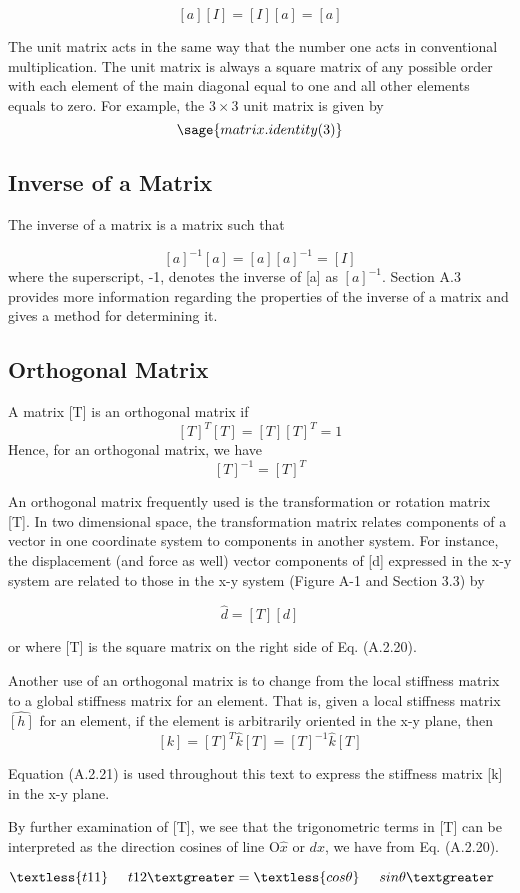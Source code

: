 \documentclass[12pt]{report}
\begin{document}
$$[a][I]=[I][a]=[a]$$

The unit matrix acts in the same way that the number one acts in
conventional multiplication. The unit matrix is always a square matrix
of any possible order with each element of the main diagonal equal to
one and all other elements equals to zero. For example, the $3 \times 3$
unit matrix is given by
$$\sage{matrix.identity(3)}$$

\subsection{Inverse of a Matrix}

The inverse of a matrix is a matrix such that

$$[a]^{-1}[a]=[a][a]^{-1}=[I]$$
where the superscript, -1, denotes the inverse of [a] as $[a]^{-1}$.
Section A.3 provides more information regarding the properties of the
inverse of a matrix and gives a method for determining it.

\subsection{Orthogonal Matrix}
A matrix [T] is an orthogonal matrix if
$$[T]^T[T] = [T][T]^T=1$$
Hence, for an orthogonal matrix, we have
$$[T]^{-1}=[T]^T$$

An orthogonal matrix frequently used is the transformation or rotation
matrix [T]. In two dimensional space, the transformation matrix
relates components of a vector in one coordinate system to components
in another system. For instance, the displacement (and force as well)
vector components of [d] expressed in the x-y system are related to
those in the x-y system (Figure A-1 and Section 3.3) by

$$\hat{d}=[T][d]$$


or
where [T] is the square matrix on the right side of Eq. (A.2.20).


Another use of an orthogonal matrix is to change from the local
stiffness matrix to a global stiffness matrix for an element. That is,
given a local stiffness matrix $\hat{[h]}$ for an element, if the
element is arbitrarily oriented in the x-y plane, then
$$[k]=[T]^T \hat{k}[T]=[T]^{-1}\hat{k}[T]$$

Equation (A.2.21) is used throughout this text to express the
stiffness matrix [k] in the x-y plane.

By further examination of [T], we see that the trigonometric terms in
[T] can be interpreted as the direction cosines of line O$\hat{x}$ or
$d{x}$, we have from Eq. (A.2.20).

\begin{center}
$\textless{t11}\hspace{0.5cm}{t12}\textgreater=\textless{cos\theta}\hspace{0.5cm}{sin\theta}\textgreater$
\end{center}
\end{document}
